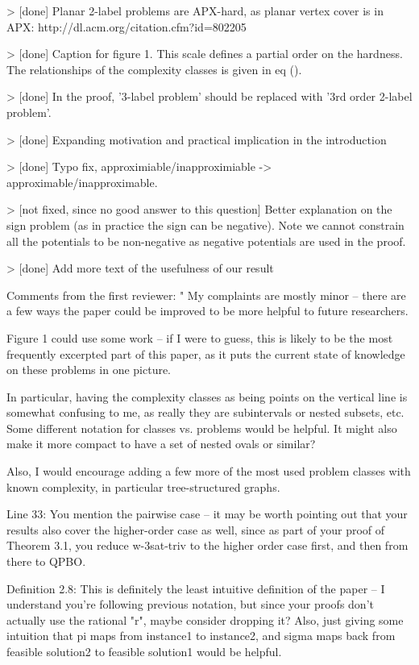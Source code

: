 > [done] Planar 2-label problems are APX-hard,
as planar vertex cover is in APX:
http://dl.acm.org/citation.cfm?id=802205

> [done] Caption for figure 1. This scale defines a partial order on the hardness. The relationships of the complexity classes is given in eq ().

> [done] In the proof, '3-label problem' should be replaced with '3rd order 2-label problem'.

> [done] Expanding motivation and practical implication in the introduction

> [done] Typo fix, approximiable/inapproximiable -> approximable/inapproximable.

> [not fixed, since no good answer to this question] Better explanation on the sign problem (as in practice the sign can be negative). Note we cannot constrain all the potentials to be non-negative as negative potentials are used in the proof.

> [done] Add more text of the usefulness of our result

Comments from the first reviewer:
"
My complaints are mostly minor -- there are a few ways the paper could be improved to be more helpful to future researchers.

Figure 1 could use some work -- if I were to guess, this is likely to be the most frequently excerpted part of this paper, as it puts the current state of knowledge on these problems in one picture.

In particular, having the complexity classes as being points on the vertical line is somewhat confusing to me, as really they are subintervals or nested subsets, etc. Some different notation for classes vs. problems would be helpful. It might also make it more compact to have a set of nested ovals or similar? 

Also, I would encourage adding a few more of the most used problem classes with known complexity, in particular tree-structured graphs.

Line 33: You mention the pairwise case -- it may be worth pointing out that your results also cover the higher-order case as well, since as part of your proof of Theorem 3.1, you reduce w-3sat-triv to the higher order case first, and then from there to QPBO.

Definition 2.8: This is definitely the least intuitive definition of the paper -- I understand you're following previous notation, but since your proofs don't actually use the rational "r", maybe consider dropping it? Also, just giving some intuition that pi maps from instance1 to instance2, and sigma maps back from feasible solution2 to feasible solution1 would be helpful.

